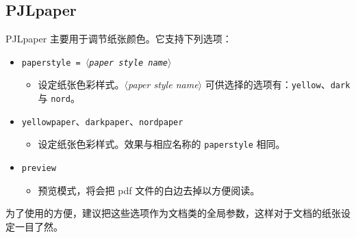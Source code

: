 \documentclass[Chinese,English,French,allowbf,puretext]{lebhart}
\providecommand{\meta}[1]{$\langle${\normalfont\itshape#1}$\rangle$}
\providecommand{\PJLpaper}{\textsf{PJLpaper}}
\begin{document}





\clearpage
\subsection{PJLpaper}

\PJLpaper{} 主要用于调节纸张颜色。它支持下列选项：

\begin{itemize}
    \item \texttt{paperstyle = \meta{paper style name}}
        \begin{itemize}
            \item 设定纸张色彩样式。\meta{paper style name} 可供选择的选项有：\texttt{yellow}、\texttt{dark} 与 \texttt{nord}。
        \end{itemize}
    \item \texttt{yellowpaper}、\texttt{darkpaper}、\texttt{nordpaper}
        \begin{itemize}
            \item 设定纸张色彩样式。效果与相应名称的 \texttt{paperstyle} 相同。
        \end{itemize}
    \item \texttt{preview}
        \begin{itemize}
            \item 预览模式，将会把 pdf 文件的白边去掉以方便阅读。
        \end{itemize}
\end{itemize}

为了使用的方便，建议把这些选项作为文档类的全局参数，这样对于文档的纸张设定一目了然。
\end{document}
